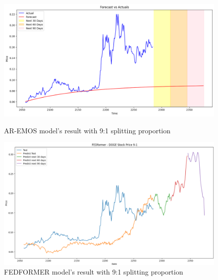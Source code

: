 \documentclass{ieeeojies}
\begin{document}
\begin{figure}[H]
    \centering
    \begin{minipage}{0.23\textwidth}
    \centering
    \includegraphics[width=1\textwidth]{bibliography/Figure/PREDICT/DOGE_AR-EMOS_9-1.png}
    \caption{AR-EMOS model's result with 9:1 splitting proportion}
    \label{fig10}
    \end{minipage}
    \hfill
    \begin{minipage}{0.23\textwidth}
    \centering
    \includegraphics[width=1\textwidth]{bibliography/fed doge 91.png}
    \caption{FEDFORMER model's result with 9:1 splitting proportion}
    \label{fig11}
    \end{minipage}
\end{figure}
\end{document}
